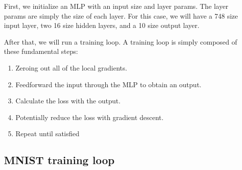 First, we initialize an MLP with an input size and layer params. The layer params are 
simply the size of each layer. For this case, we will have a 748 size input layer, two 16 size
hidden layers, and a 10 size output layer.

After that, we will run a training loop. A training loop is simply composed of these fundamental steps:
\begin{enumerate}
    \item Zeroing out all of the local gradients. 
    \item Feedforward the input through the MLP to obtain an output.
    \item Calculate the loss with the output.
    \item Potentially reduce the loss with gradient descent.
    \item Repeat until satisfied
\end{enumerate}






\subsection{MNIST training loop}

